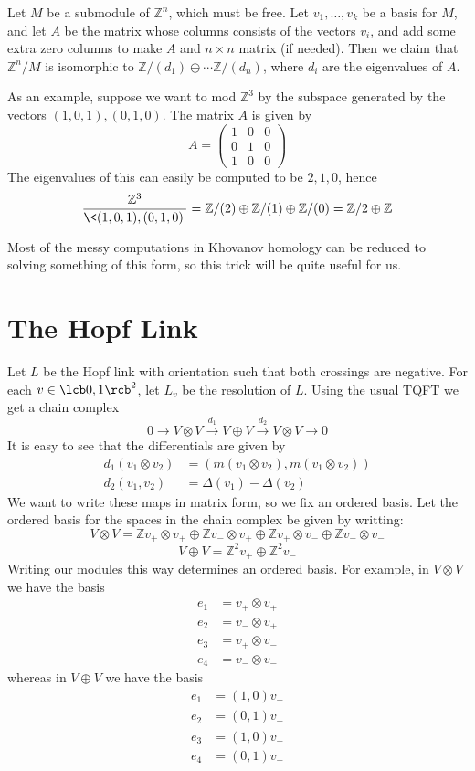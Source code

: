 Let $M$ be a submodule of $\mathbb Z^n$, which must be free. Let $v_1,\ldots,v_k$ be a basis for $M$, and let $A$ be the matrix whose columns consists of the vectors $v_i$, and add some extra zero columns to make $A$ and $n \times n$ matrix (if needed). Then we claim that $\mathbb Z^n / M$ is isomorphic to $\mathbb Z/(d_1) \oplus \cdots \mathbb Z/(d_n)$, where $d_i$ are the eigenvalues of $A$. 

As an example, suppose we want to mod $\mathbb Z^3$ by the subspace generated by the vectors $(1,0,1),(0,1,0)$. The matrix $A$ is given by
\[ A = \left( \begin{array}{ccc} 1 & 0 & 0 \\ 0 & 1 & 0 \\ 1 & 0 & 0 \end{array} \right) \]
The eigenvalues of this can easily be computed to be $2,1,0$, hence
\[ \frac{\mathbb Z^3}{\< (1,0,1), (0,1,0) \>} = \mathbb Z/(2) \oplus \mathbb Z/(1) \oplus \mathbb Z/(0) = \mathbb Z/2 \oplus \mathbb Z \]

Most of the messy computations in Khovanov homology can be reduced to solving something of this form, so this trick will be quite useful for us.



\section{The Hopf Link}


Let $L$ be the Hopf link with orientation such that both crossings are negative. For each $v \in \lcb 0,1 \rcb^2$, let $L_v$ be the resolution of $L$. Using the usual TQFT we get a chain complex
\[ 0 \longrightarrow V \otimes V \stackrel{d_1}{\longrightarrow} V \oplus V \stackrel{d_2}{\longrightarrow} V \otimes V \longrightarrow 0 \]
It is easy to see that the differentials are given by
\begin{align}
	d_1(v_1 \otimes v_2) &= (m(v_1 \otimes v_2), m(v_1 \otimes v_2)) \\
	d_2(v_1,v_2) &= \Delta(v_1) - \Delta(v_2) 
\end{align}
We want to write these maps in matrix form, so we fix an ordered basis. Let the ordered basis for the spaces in the chain complex be given by writting:
\[ V \otimes V = \mathbb Z v_+ \otimes v_+ \oplus \mathbb Z v_- \otimes v_+ \oplus \mathbb Z v_+ \otimes v_- \oplus \mathbb Z v_- \otimes v_- \]
\[ V \oplus V = \mathbb Z^2 v_+ \oplus \mathbb Z^2 v_- \]
Writing our modules this way determines an ordered basis. For example, in $V \otimes V$ we have the basis 
\begin{align*}
e_1 &= v_+ \otimes v_+ \\
e_2 &= v_- \otimes v_+ \\
e_3 &= v_+ \otimes v_- \\
e_4 &= v_- \otimes v_-
\end{align*}
whereas in $V \oplus V$ we have the basis
\begin{align*}
e_1 &= (1,0)v_+ \\
e_2 &= (0,1)v_+ \\
e_3 &= (1,0)v_- \\
e_4 &= (0,1)v_- 
\end{align*}

